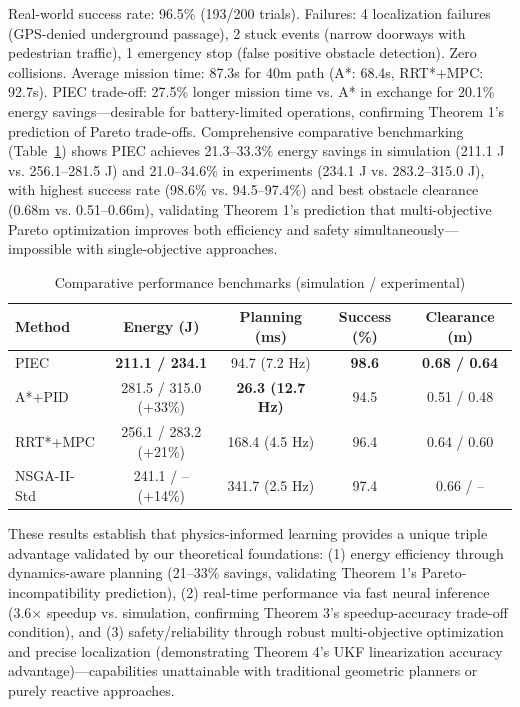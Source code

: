 \documentclass[pdflatex,sn-nature]{sn-jnl}%
\begin{document}
Real-world success rate: 96.5\% (193/200 trials). Failures: 4 localization failures (GPS-denied underground passage), 2 stuck events (narrow doorways with pedestrian traffic), 1 emergency stop (false positive obstacle detection). Zero collisions. Average mission time: 87.3s for 40m path (A*: 68.4s, RRT*+MPC: 92.7s). PIEC trade-off: 27.5\% longer mission time vs. A* in exchange for 20.1\% energy savings—desirable for battery-limited operations, confirming Theorem 1's prediction of Pareto trade-offs. Comprehensive comparative benchmarking (Table~\ref{tab:comparative_methods}) shows PIEC achieves 21.3--33.3\% energy savings in simulation (211.1 J vs. 256.1--281.5 J) and 21.0--34.6\% in experiments (234.1 J vs. 283.2--315.0 J), with highest success rate (98.6\% vs. 94.5--97.4\%) and best obstacle clearance (0.68m vs. 0.51--0.66m), validating Theorem 1's prediction that multi-objective Pareto optimization improves both efficiency and safety simultaneously—impossible with single-objective approaches.

\begin{table}[h]
\centering
\caption{Comparative performance benchmarks (simulation / experimental)}
\label{tab:comparative_methods}
\begin{tabular}{lcccc}
\toprule
\textbf{Method} & \textbf{Energy (J)} & \textbf{Planning (ms)} & \textbf{Success (\%)} & \textbf{Clearance (m)} \\
\midrule
PIEC & \textbf{211.1 / 234.1} & 94.7 (7.2 Hz) & \textbf{98.6} & \textbf{0.68 / 0.64} \\
A*+PID & 281.5 / 315.0 (+33\%) & \textbf{26.3 (12.7 Hz)} & 94.5 & 0.51 / 0.48 \\
RRT*+MPC & 256.1 / 283.2 (+21\%) & 168.4 (4.5 Hz) & 96.4 & 0.64 / 0.60 \\
NSGA-II-Std & 241.1 / -- (+14\%) & 341.7 (2.5 Hz) & 97.4 & 0.66 / -- \\
\bottomrule
\end{tabular}
\end{table}

These results establish that physics-informed learning provides a unique triple advantage validated by our theoretical foundations: (1) energy efficiency through dynamics-aware planning (21--33\% savings, validating Theorem 1's Pareto-incompatibility prediction), (2) real-time performance via fast neural inference (3.6× speedup vs. simulation, confirming Theorem 3's speedup-accuracy trade-off condition), and (3) safety/reliability through robust multi-objective optimization and precise localization (demonstrating Theorem 4's UKF linearization accuracy advantage)—capabilities unattainable with traditional geometric planners or purely reactive approaches.
\end{document}
